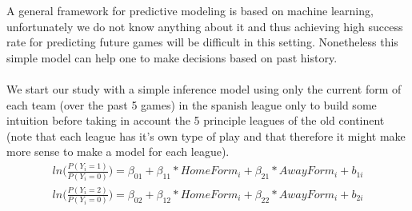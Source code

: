 \documentclass[letterpaper, 11pt]{article}
\theoremstyle{break}
\begin{document}
				A general framework for predictive modeling is based on machine learning, unfortunately we do not know anything about it and thus achieving high success rate for predicting future games will be difficult in this setting. Nonetheless this simple model can help one to make decisions based on past history. \\\\ 
				
				We start our study with a simple inference model using only the current form of each team (over the past 5 games) in the spanish league only to build some intuition before taking in account the 5 principle leagues of the old continent (note that each league has it's own type of play and that therefore it might make more sense to make a model for each league).\\
				
				\begin{align*}
				ln \Big( \frac{P(Y_i = 1)}{P(Y_i = 0)} \Big) = \beta_{01} + \beta_{11}*HomeForm_i + \beta_{21}*AwayForm_i + b_{1i} \\
				ln \Big( \frac{P(Y_i = 2)}{P(Y_i = 0)} \Big) = \beta_{02} + \beta_{12}*HomeForm_i + \beta_{22}*AwayForm_i + b_{2i}				
				\end{align*}
				
\end{document}
